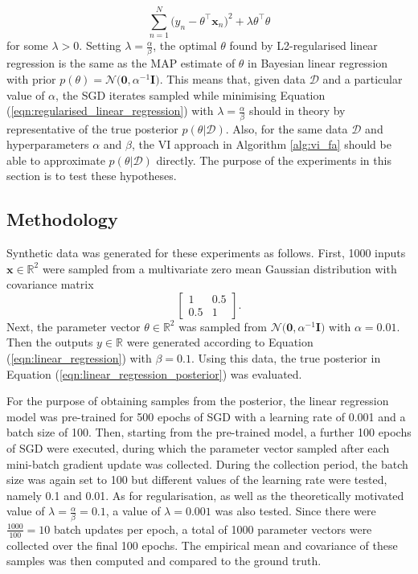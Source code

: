 \documentclass[msc,deptreport.inf]{infthesis} %
\newcommand{\matr}[1]{\mathbf{#1}}
\newcommand{\R}{\mathbb R}
\begin{document}
\begin{equation}\label{eqn:regularised_linear_regression}
	\sum_{n=1}^N \big(y_n - \theta^\intercal \matr{x}_n \big)^2 
	+ \lambda \theta^\intercal \theta 
\end{equation}
for some $\lambda > 0$. Setting $\lambda = \frac{\alpha}{\beta}$, the optimal $\theta$ found by L2-regularised linear regression is the same as the MAP estimate of $\theta$ in Bayesian linear regression with prior $p(\theta) = \mathcal{N}\big(\matr{0}, \alpha^{-1} \matr{I} \big)$. This means that, given data $\mathcal{D}$ and a particular value of $\alpha$, the SGD iterates sampled while minimising Equation (\ref{eqn:regularised_linear_regression}) with $\lambda = \frac{\alpha}{\beta}$ should in theory by representative of the true posterior $p(\theta | \mathcal{D})$. Also, for the same data $\mathcal{D}$ and hyperparameters $\alpha$ and $\beta$, the VI approach in Algorithm \ref{alg:vi_fa} should be able to approximate $p(\theta | \mathcal{D})$ directly. The purpose of the experiments in this section is to test these hypotheses. 
 
\subsection{Methodology}

Synthetic data was generated for these experiments as follows. First, 1000 inputs $\matr{x} \in \R^2$ were sampled from a multivariate zero mean Gaussian distribution with covariance matrix
\begin{equation}
	\begin{bmatrix}
		1 & 0.5 \\
		0.5 & 1
	\end{bmatrix}.
\end{equation}
Next, the parameter vector $\theta \in \R^2$ was sampled from $\mathcal{N}\big(\matr{0}, \alpha^{-1} \matr{I} \big)$ with $\alpha = 0.01$. Then the outputs $y \in \R$ were generated according to Equation (\ref{eqn:linear_regression}) with $\beta = 0.1$. Using this data, the true posterior in Equation (\ref{eqn:linear_regression_posterior}) was evaluated. 

For the purpose of obtaining samples from the posterior, the linear regression model was pre-trained for 500 epochs of SGD with a learning rate of 0.001 and a batch size of 100. Then, starting from the pre-trained model, a further 100 epochs of SGD were executed, during which the parameter vector sampled after each mini-batch gradient update was collected. During the collection period, the batch size was again set to 100 but different values of the learning rate were tested, namely 0.1 and 0.01. As for regularisation, as well as the theoretically motivated value of $\lambda = \frac{\alpha}{\beta} = 0.1$, a value of $\lambda = 0.001$ was also tested. Since there were $\frac{1000}{100} = 10$ batch updates per epoch, a total of 1000 parameter vectors were collected over the final 100 epochs. The empirical mean and covariance of these samples was then computed and compared to the ground truth. 
\end{document}
